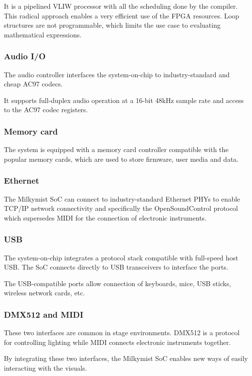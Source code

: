 \documentclass[a4paper,11pt,twocolumn]{paper}
\begin{document}
It is a pipelined VLIW processor with all the scheduling done by the compiler. This radical approach enables a very efficient use of the FPGA resources. Loop structures are not programmable, which limits the use case to evaluating mathematical expressions.

\subsubsection{Audio I/O}
The audio controller interfaces the system-on-chip to industry-standard and cheap AC97 codecs.

It supports full-duplex audio operation at a 16-bit 48kHz sample rate and access to the AC97 codec registers.

\subsubsection{Memory card}
The system is equipped with a memory card controller compatible with the popular memory cards, which are used to store firmware, user media and data.

\subsubsection{Ethernet}
The Milkymist SoC can connect to industry-standard Ethernet PHYs to enable TCP/IP network connectivity and specifically the OpenSoundControl protocol which supersedes MIDI for the connection of electronic instruments.

\subsubsection{USB}
The system-on-chip integrates a protocol stack compatible with full-speed host USB. The SoC connects directly to USB transceivers to interface the ports.

The USB-compatible ports allow connection of keyboards, mice, USB sticks, wireless network cards, etc.

\subsubsection{DMX512 and MIDI}
These two interfaces are common in stage environments. DMX512 is a protocol for controlling lighting while MIDI connects electronic instruments together.

By integrating these two interfaces, the Milkymist SoC enables new ways of easily interacting with the visuals.
\end{document}

